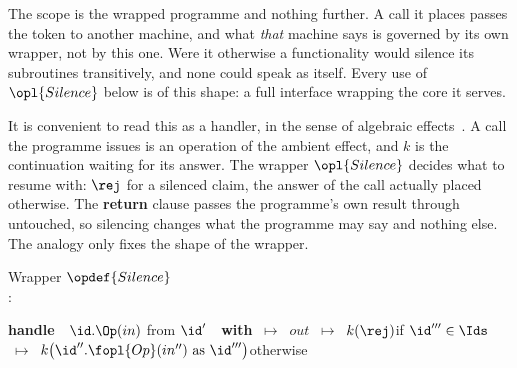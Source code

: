 \documentclass[10pt,oneside,openany]{book}
\theoremstyle{accentdef}
\theoremstyle{accentplain}
\begin{document}
The scope is the wrapped programme and nothing further. A call it places passes the token to
another machine, and what \emph{that} machine says is governed by its own wrapper, not by this
one. Were it otherwise a functionality would silence its subroutines transitively, and none could
speak as itself. Every use of $\opl{Silence}$ below is of this shape: a full interface wrapping
the core it serves.

It is convenient to read this as a handler, in the sense of algebraic
effects~\cite{PP09,BP15}. A call the programme issues is an operation of the
ambient effect, and $k$ is the continuation waiting for its answer. The wrapper $\opl{Silence}$ decides what
to resume with: $\rej$ for a silenced claim, the answer of the call actually placed otherwise.
The \textbf{return} clause passes the programme's own result through untouched, so silencing
changes what the programme may say and nothing else. The analogy only fixes the shape of the
wrapper.

\begin{procedure}{Wrapper $\opdef{Silence}$ \\
}
:
\begin{algorithmic}[1]
\State \textbf{handle}\ \ $\id.\Op(in)$ from $\id'$\ \ \textbf{with}
\State \enspace {}
       $\ \mapsto\ $ $out$
\State \enspace {}
       $\ \mapsto\ $ $k(\rej)$\enspace\hfill if $\id''' \in \Ids$
\State \enspace \makebox[\clausewd][l]{}
       $\ \mapsto\ $ $k\bigl(\id''.\fopl{Op}(in'')\ \text{as}\ \id'''\bigr)$\enspace\hfill otherwise
\end{algorithmic}
\end{procedure}
\end{document}

